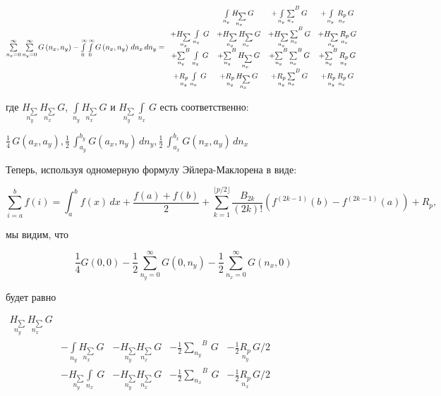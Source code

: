 \documentclass[11pt]{article}
\begin{document}
\(\sum\limits_{n_x=0}^{\infty} \sum\limits_{n_y=0}^{\infty} G\left(n_x, n_y\right) -\int\limits_{0}^{\infty} \int\limits_{0}^{\infty} G\left(n_x, n_y\right)\,d{n_x}\,d{n_y} = \\ \begin{array}{cccc}  \, &  \int\limits_{n_y}^{} \underset{n_x}{H_{\sum}}\,G &  + \int\limits_{n_y}^{}{\sum\limits_{n_x}^{}}^{B}\,G &  + \int\limits_{n_y}^{}\,\underset{n_x}{R_{p}}\,G \\  +\underset{n_y}{H_{\sum}}\,\int\limits_{n_x}^{}\,G &  + \underset{n_y}{H_{\sum}}\,\underset{n_x}{H_{\sum}}\,G &  + \underset{n_y}{H_{\sum}}\,{\sum\limits_{n_x}^{}}^{B}\,G &  + \underset{n_y}{H_{\sum}}\,\underset{n_x}{R_{p}}\,G \\  + {\sum\limits_{n_y}^{}}^{B}\,\int\limits_{n_x}^{}\,G &  + {\sum\limits_{n_y}^{}}^{B}\,\underset{n_x}{H_{\sum}}\,G &  + {\sum\limits_{n_y}^{}}^{B}\,{\sum\limits_{n_x}^{}}^{B}\,G &  + {\sum\limits_{n_y}^{}}^{B}\,\underset{n_x}{R_{p}}\,G \\  + \underset{n_y}{R_{p}}\,\int\limits_{n_x}^{}\,G &  + \underset{n_y}{R_{p}}\,\underset{n_x}{H_{\sum}}\,G &  + \underset{n_y}{R_{p}}\,{\sum\limits_{n_x}^{}}^{B}\,G &  + \underset{n_y}{R_{p}}\,\underset{n_x}{R_{p}}\,G \end{array}\)

    где \(\underset{n_y}{H_{\sum}}\,\underset{n_x}{H_{\sum}}\,G\),
\(\int\limits_{n_y}^{} \underset{n_x}{H_{\sum}}\,G\) и
\(\underset{n_y}{H_{\sum}}\,\int\limits_{n_x}^{}\,G\) есть
соответственно:

    \(\frac{1}{4} \, G\left(a_{x}, a_{y}\right) , \frac{1}{2} \, \int_{a_{y}}^{b_{y}} G\left(a_{x}, n_{y}\right)\,{d n_{y}} , \frac{1}{2} \, \int_{a_{x}}^{b_{x}} G\left(n_{x}, a_{y}\right)\,{d n_{x}}\)

    Теперь, используя одномерную формулу Эйлера-Маклорена в виде:

    \[{\displaystyle \sum _{i=a}^{b}f(i)=\int _{a}^{b}f(x)\,dx+{\frac {f(a)+f(b)}{2}}+\sum _{k=1}^{\lfloor p/2\rfloor }{\frac {B_{2k}}{(2k)!}}(f^{(2k-1)}(b)-f^{(2k-1)}(a))+R_{p},}\]

    мы видим, что

    \[
\frac{1}{4}G\left(0, 0\right)
- \frac{1}{2}\sum\limits_{n_y=0}^{\infty}{G\left(0, n_y\right)}
- \frac{1}{2}\sum\limits_{n_x=0}^{\infty}{G\left(n_x, 0\right)}
\]

    будет равно

    \(\begin{array}{rrllll}  \underset{n_y}{H_{\sum}}\,\underset{n_x}{H_{\sum}}\,G \\  \, &  - \int\limits_{n_y}^{} \underset{n_x}{H_{\sum}}\,G &  - \underset{n_y}{H_{\sum}} \underset{n_x}{H_{\sum}}\,G &  - \frac{1}{2}{\sum\limits_{n_y}^{}}^{B}\,G &  - \frac{1}{2}\underset{n_y}{R_{p}}\,G/2 \\  \,&  - \underset{n_y}{H_{\sum}}\int\limits_{n_x}^{} \,G &  - \underset{n_y}{H_{\sum}} \underset{n_x}{H_{\sum}}\,G &  - \frac{1}{2}{\sum\limits_{n_x}^{}}^{B}\,G &  - \frac{1}{2}\underset{n_x}{R_{p}}\,G/2 \\ \end{array}\)
\end{document}

